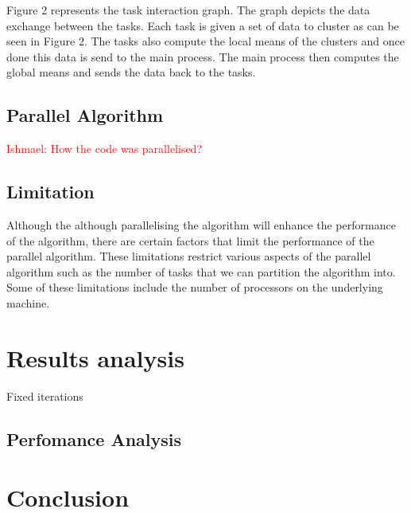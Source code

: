 \documentclass[12pt]{article}
\begin{document}
    			\begin{flushleft}
    				Figure 2 represents the task interaction graph. The graph depicts the data exchange between the tasks. Each task is given a set of data to cluster as can be seen in Figure 2. The tasks also compute the local means of the clusters and once done this data is send to the main process. The main process then computes the global means and sends the data back to the tasks.
    			\end{flushleft}
    	
    	\subsection{Parallel Algorithm}
    	\textcolor{red}{Ishmael: How the code was parallelised?}
    	
    	\subsection{Limitation}
 			\begin{flushleft}
 				Although the although parallelising the algorithm will enhance the performance of the algorithm, there are certain factors that limit the performance of the parallel algorithm. These limitations restrict various aspects of the parallel algorithm such as the number of tasks that we can partition the algorithm into. Some of these limitations include the number of processors on the underlying machine.
 			\end{flushleft}

  	\section{Results analysis}
    	\begin{flushleft}
			Fixed iterations
    	\end{flushleft}
    	
    	\subsection{Perfomance Analysis}
    		\begin{flushleft}
    			
    		\end{flushleft}
    	
	\section{Conclusion}
    	\begin{flushleft}
			
    	\end{flushleft}
\end{document}
